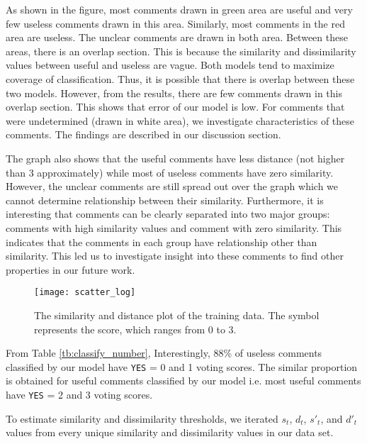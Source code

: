 As shown in the figure, most comments drawn in green area are useful and very few useless comments drawn in this area. Similarly, most comments in the red area are useless. The unclear comments are drawn in both area. Between these areas, there is an overlap section. This is because the similarity and dissimilarity values between useful and useless are vague. Both models tend to maximize coverage of classification. Thus, it is possible that there is overlap between these two models. However, from the results, there are few comments drawn in this overlap section. This shows that error of our model is low.
For comments that were undetermined (drawn in white area), we investigate characteristics of these comments. The findings are described in our discussion section.

The graph also shows that the useful comments have less distance (not higher than 3 approximately) while most of useless comments have zero similarity. However, the unclear comments are still spread out over the graph which we cannot determine relationship between their similarity.
Furthermore, it is interesting that comments can be clearly separated into two major groups: comments with high similarity values and comment with zero similarity. This indicates that the comments  in each group have relationship other than similarity. This led us to investigate insight into these comments to find other properties in our future work. 

\begin{figure}[!t]
\centering
\texttt{[image: scatter\_log]}
\caption{The similarity and distance plot of the training data.
The symbol represents the score, which ranges from 0 to 3.}
\label{fig:scatter}
\end{figure}


From Table \ref{tb:classify_number}, Interestingly, 88\% of useless comments classified by our model have \texttt{YES} = 0 and 1 voting scores.
The similar proportion is obtained for useful comments classified by our model i.e. most useful comments have \texttt{YES} = 2 and 3 voting scores.

To estimate similarity and dissimilarity thresholds, we iterated $s_t$, $d_t$, $s'_t$, and $d'_t$ values from every unique similarity and dissimilarity values in our data set.
  
